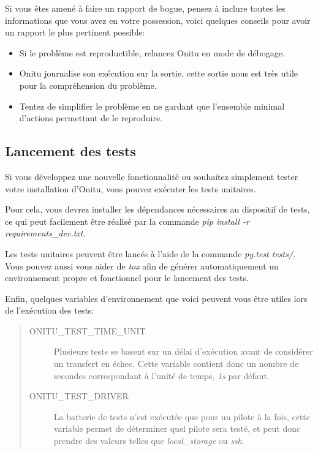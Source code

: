 \documentclass[letterpaper,10pt,english]{sphinxmanual}
\begin{document}
Si vous êtes amené à faire un rapport de bogue, pensez à inclure toutes les informations que vous avez en votre possession, voici quelques conseils pour avoir un rapport le plus pertinent possible:
\begin{itemize}
\item {} 
Si le problème est reproductible, relancez Onitu en mode de débogage.

\item {} 
Onitu journalise son exécution sur la sortie, cette sortie nous est très utile pour la compréhension du problème.

\item {} 
Tentez de simplifier le problème en ne gardant que l'ensemble minimal d'actions permettant de le reproduire.

\end{itemize}


\subsection{Lancement des tests}
\label{contribute:tests}\label{contribute:running-the-tests}
Si vous développez une nouvelle fonctionnalité ou souhaitez simplement tester votre installation d'Onitu, vous pouvez exécuter les tests unitaires.

Pour cela, vous devrez installer les dépendances nécessaires au dispositif de tests, ce qui peut facilement être réalisé par la commande \emph{pip install -r requirements\_dev.txt}.

Les tests unitaires peuvent être lancés à l'aide de la commande \emph{py.test tests/}. Vous pouvez aussi vous aider de \emph{tox} afin de générer automatiquement un environnement propre et fonctionnel pour le lancement des tests.

Enfin, quelques variables d'environnement que voici peuvent vous être utiles lors de l'exécution des tests:
\begin{quote}
\begin{description}
\item[{ONITU\_TEST\_TIME\_UNIT}] \leavevmode
Plusieurs tests se basent sur un délai d'exécution avant de considérer un transfert en échec. Cette variable contient donc un nombre de secondes correspondant à l'unité de temps, \emph{1s} par défaut.

\item[{ONITU\_TEST\_DRIVER}] \leavevmode
La batterie de tests n'est exécutée que pour un pilote à la fois, cette variable permet de déterminer quel pilote sera testé, et peut donc prendre des valeurs telles que \emph{local\_storage} ou \emph{ssh}.

\end{description}
\end{quote}
\end{document}
